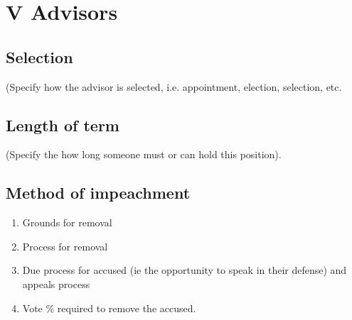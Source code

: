 
 \section{V \textendash{} Advisors}
 \subsection{Selection}
   (Specify how the advisor is selected, i.e. appointment, election,
   selection, etc.
 \subsection{Length of term}
   (Specify the how long someone must or can hold this position).
 \subsection{Method of impeachment}
     \begin{enumerate}[label=\arabic*.]
       \item Grounds for removal
       \item Process for removal
       \item Due process for accused (ie the opportunity to speak in their
       defense) and appeals process
       \item Vote \% required to remove the accused.
     \end{enumerate}
 
 